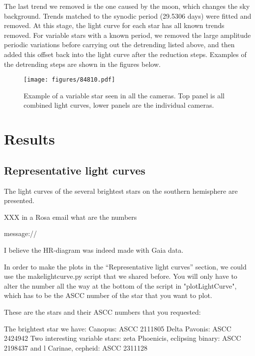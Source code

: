 \documentclass{aa}
\begin{document}
The last trend we removed is the one caused by the moon, which changes the sky background.
%
Trends matched to the synodic period (29.5306 days) were fitted and removed.
%
At this stage, the light curve for each star has all known trends removed.
%
For variable stars with a known period, we removed the large amplitude periodic variations before carrying out the detrending listed above, and then added this offset back into the light curve after the reduction steps.
%
Examples of the detrending steps are shown in the figures below.




\begin{figure*}
    \centering
    \texttt{[image: figures/84810.pdf]}
    \caption{Example of a variable star seen in all the cameras.
    Top panel is all combined light curves, lower panels are the individual cameras.}
    \label{fig:cleaned_output}
\end{figure*}

\section{Results}
\label{sec:results}

\subsection{Representative light curves}
The light curves of the several brightest stars on the southern hemisphere are presented.

XXX in a Rosa email what are the numbers

message://%

I believe the HR-diagram was indeed made with Gaia data.

In order to make the plots in the ``Representative light curves'' section, we could use the makelightcurve.py script that we shared before. You will only have to alter the number all the way at the bottom of the script in "plotLightCurve", which has to be the ASCC number of the star that you want to plot.

These are the stars and their ASCC numbers that you requested:

The brightest star we have: Canopus: ASCC 2111805
Delta Pavonis: ASCC 2424942
Two interesting variable stars: zeta Phoenicis, eclipsing binary: ASCC 2198437
and l Carinae, cepheid: ASCC 2311128
\end{document}
